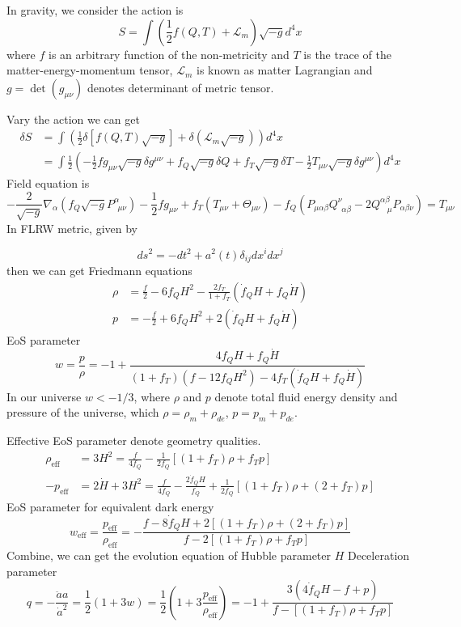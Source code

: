 \documentclass{ws-mpla}
\begin{document}
In gravity, we consider the action is
\begin{equation}
S=\int(\frac{1}{2}f(Q,T)+\mathcal{L}_m) \sqrt{-g}  d^4x 
\end{equation}
where $f$ is an arbitrary function of the non-metricity and $T$ is the trace of the matter-energy-momentum tensor, $\mathcal{L}_m$ is known as matter Lagrangian and $g=\det (g_{\mu \nu})$ denotes determinant of metric tensor.

Vary the action we can get
\begin{align}
\delta S&=\int \left(\frac{1}{2} \delta[f(Q,T) \sqrt{-g}]+\delta(\mathcal{L}_m \sqrt{-g})\right)d^4x \\
&= \int \frac{1}{2}\left(-\frac{1}{2}f g_{\mu\nu}\sqrt{-g}\delta g^{\mu\nu}+f_Q \sqrt{-g} \delta Q+f_T \sqrt{-g}\delta T -\frac{1}{2}T_{\mu \nu}\sqrt{-g}\delta g^{\mu\nu}\right)d^4x
\end{align}
Field equation is
\begin{equation}
-\frac{2}{\sqrt{-g}}\nabla_\alpha(f_Q \sqrt{-g}P^\alpha_{\ \ \mu \nu})-\frac{1}{2}f g_{\mu \nu}+f_T(T_{\mu \nu}+\Theta_{\mu \nu})-f_Q(P_{\mu \alpha \beta}Q^\nu_{\ \ \alpha \beta}-2Q^{\alpha \beta}_{\ \ \ \ \mu}P_{\alpha \beta \nu})=T_{\mu \nu}
\end{equation}
In FLRW metric, given by

\begin{equation}
ds^2=-dt^2+a^2(t)\delta_{ij} dx^i dx^j
\end{equation}
then we can get Friedmann equations
\begin{align}
\rho &=\frac{f}{2}-6f_Q H^2-\frac{2f_T}{1+f_T}(\dot{f}_QH+f_Q \dot{H}) \\
p &=-\frac{f}{2}+6f_Q H^2+2(\dot{f}_QH+f_Q \dot{H})
\end{align}
EoS parameter
\begin{equation}
    w=\frac{p}{\rho}=-1+\frac{4 f_Q H+f_Q \dot{H}}{(1+f_T)(f-12f_QH^2)-4 f_T(\dot{f}_QH+f_Q \dot{H})}
\end{equation}
In our universe $w<-1/3$, where $\rho$ and $p$ denote total fluid energy density and pressure of the universe, which $\rho=\rho_m+\rho_{de}$, $p=p_m+p_{de}$.

Effective EoS parameter denote geometry qualities.
\begin{align}
\rho_{\text{eff}}&=3H^2=\frac{f}{4f_Q}-\frac{1}{2f_Q}[(1+f_T)\rho+f_T p]\\
-p_{\text{eff}}&=2\dot{H}+3H^2=\frac{f}{4f_Q}-\frac{2\dot{f}_Q H}{f_Q}+\frac{1}{2f_Q}[(1+f_T)\rho +(2+f_T)p]
\end{align}
EoS parameter for equivalent dark energy
\begin{equation}
w_{\text{eff}}=\frac{p_{\text{eff}}}{\rho_{\text{eff}}} = -\frac{f - 8\dot{f}_Q H + 2[(1 + f_T)\rho + (2 + f_T)p]}{f - 2[(1 + f_T)\rho + f_T p]}
\end{equation}
Combine, we can get the evolution equation of Hubble parameter $H$
Deceleration parameter
\begin{equation}
    q=-\frac{\ddot{a}a}{\dot{a}^2}=\frac{1}{2}(1+3w)=\frac{1}{2}\left(1+3\frac{p_{\text{eff}}}{\rho_{\text{eff}}}\right)=-1+\frac{3(4\dot{f}_QH-f+p)}{f-[(1+f_T)\rho+f_Tp]}
\end{equation}
\end{document}
